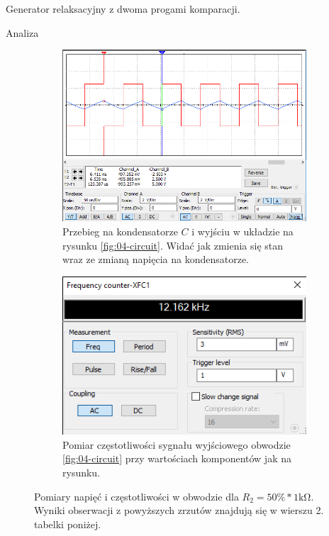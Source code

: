 \documentclass[a4paper]{scrartcl}
\begin{document}
\begin{section}{Generator relaksacyjny z dwoma progami komparacji.}
\begin{subsection}{Analiza}
				\begin{figure}[!ht]
				\begin{center}
					\begin{subfigure}{.63\textwidth}
						\begin{center}
						\includegraphics[width=\linewidth,scale=2]{04-osciloscope}
						\caption{Przebieg na kondensatorze $ C $ i wyjściu w układzie na rysunku \ref{fig:04-circuit}. Widać jak zmienia się stan wraz ze zmianą napięcia na kondensatorze.}
						\end{center}
					\end{subfigure}%
					\begin{subfigure}{.35\textwidth}
						\begin{center}
						\includegraphics[width=\linewidth,scale=2]{04-freq}
						\caption{Pomiar częstotliwości sygnału wyjściowego obwodzie \ref{fig:04-circuit} przy wartościach komponentów jak na rysunku.}
						\end{center}
					\end{subfigure}
				\end{center}
				\caption{Pomiary napięć i częstotliwości w obwodzie dla $ R_{2} = 50\%*1\mathrm{k\Omega} $. Wyniki obserwacji z powyższych zrzutów znajdują się w wierszu 2. tabelki poniżej.}
				\end{figure}


\end{subsection}
\end{section}
\end{document}
